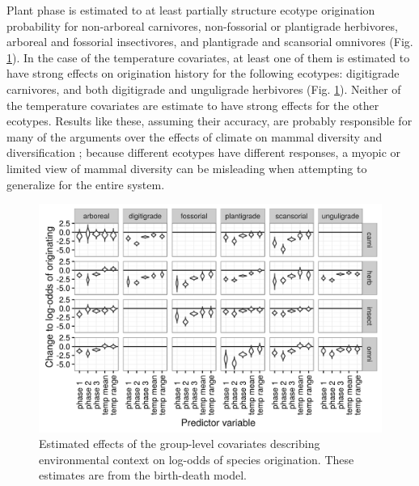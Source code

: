 \documentclass[12pt,letterpaper]{article}
\begin{document}
Plant phase is estimated to at least partially structure ecotype origination probability for non-arboreal carnivores, non-fossorial or plantigrade herbivores, arboreal and fossorial insectivores, and plantigrade and scansorial omnivores (Fig. \ref{fig:group_origin_bd}). 
In the case of the temperature covariates, at least one of them is estimated to have strong effects on origination history for the following ecotypes: digitigrade carnivores, and both digitigrade and unguligrade herbivores (Fig. \ref{fig:group_origin_bd}). Neither of the temperature covariates are estimate to have strong effects for the other ecotypes. Results like these, assuming their accuracy, are probably responsible for many of the arguments over the effects of climate on mammal diversity and diversification \citep{Alroy1996a,Alroy2000g,Figueirido2012,Janis1993c,Blois2009}; because different ecotypes have different responses, a myopic or limited view of mammal diversity can be misleading when attempting to generalize for the entire system.

\begin{figure}[ht]
  \centering
  \includegraphics[width=\textwidth,height=0.5\textheight,keepaspectratio=true]{figure/group_on_origin_bd}
  \caption[Effects of group-level covariates on log-odds of ecotype origination as estimated from the the birth-death model]{Estimated effects of the group-level covariates describing environmental context on log-odds of species origination. These estimates are from the birth-death model.}
  \label{fig:group_origin_bd}
\end{figure}
\end{document}
